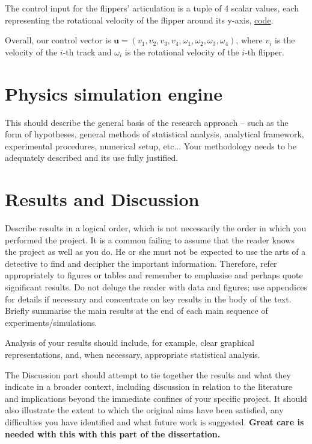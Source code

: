 \documentclass[a4paper,12pt]{article}
\begin{document}
The control input for the flippers' articulation is a tuple of 4 scalar values, each representing the rotational velocity of the flipper around its y-axis, \href{https://github.com/edavidk7/tracked_sim_rl/blob/main/engine/engine.py#L92}{code}.

Overall, our control vector is $\mathbf{u} = \left(v_1, v_2, v_3, v_4, \omega_1, \omega_2, \omega_3, \omega_4\right)$, where $v_i$ is the velocity of the $i$-th track and $\omega_i$ is the rotational velocity of the $i$-th flipper.

\section{Physics simulation engine}
\label{sec:engine}


This should describe the general basis of the research approach – such as the form of hypotheses, general methods of statistical analysis, analytical framework, experimental procedures, numerical setup, etc... Your methodology needs to be adequately described and its use fully justified.


\clearpage


\section{Results and Discussion}
\label{sec:results-discussion}

Describe results in a logical order, which is not necessarily the order in which you performed the project. It is a common failing to assume that the reader knows the project as well as you do. He or she must not be expected to use the arts of a detective to find and decipher the important information. Therefore, refer appropriately to figures or tables and remember to emphasise and perhaps quote significant results. Do not deluge the reader with data and figures; use appendices for details if necessary and concentrate on key results in the body of the text. Briefly summarise the main results at the end of each main sequence of experiments/simulations.

Analysis of your results should include, for example, clear graphical representations, and, when necessary, appropriate statistical analysis.

The Discussion part should attempt to tie together the results and what they indicate in a broader
context, including discussion in relation to the literature and implications beyond the immediate
confines of your specific project. It should also illustrate the extent to which the original aims
have been satisfied, any difficulties you have identified and what future work is suggested.
\textbf{Great care is needed with this with this part of the dissertation.} 
\end{document}
